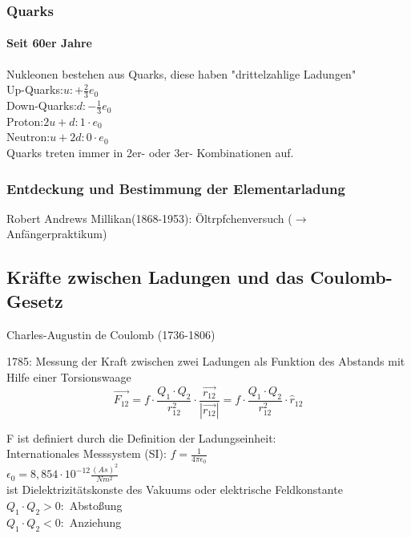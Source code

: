 \documentclass[11pt]{article}
\begin{document}
\subsubsection{ Quarks }	
\paragraph{Seit 60er Jahre}
Nukleonen bestehen aus Quarks, diese haben "drittelzahlige Ladungen"
\\
Up-Quarks:$u:+\frac{2}{3	}e_0$
\\
Down-Quarks:$d:-\frac{1}{3}e_0$
\\
Proton:$2u+d: 1\cdot e_0$
\\
Neutron:$u+2d: 0\cdot e_0$
\\

Quarks treten immer in 2er- oder 3er- Kombinationen auf.
\\

\subsubsection{Entdeckung und Bestimmung der Elementarladung}

Robert Andrews Millikan(1868-1953): Öltrpfchenversuch ($\rightarrow$ Anf\"{a}ngerpraktikum)


\subsection{Kr\"{a}fte zwischen Ladungen und das Coulomb-Gesetz} 

Charles-Augustin de Coulomb (1736-1806)

1785: Messung der Kraft zwischen zwei Ladungen als Funktion des Abstands mit Hilfe einer Torsionswaage \hfill \\

$$ \boxed{\vec{F_{12}} = f\cdot\frac{Q_1\cdot Q_2}{r^2_{12}}\cdot\frac{\vec{r_{12}}}{|\vec{r_{12}}|} = f\cdot\frac{Q_1\cdot Q_2}{r^2_{12}}\cdot \hat{r}_{12}} $$

\noindent F ist definiert durch die Definition der Ladungseinheit:
\\
Internationales Messsystem (SI): $f=\frac{1}{4\pi\epsilon_0}$
\\
$\epsilon_0=8,854\cdot10^{-12}\frac{(As)^2}{Nm^2}$
\\
ist Dielektrizit\"{a}tskonste des Vakuums oder elektrische Feldkonstante
\\
$Q_1\cdot Q_2 > 0:$ Abstoßung
\\
$Q_1\cdot Q_2 < 0:$ Anziehung
\end{document}
